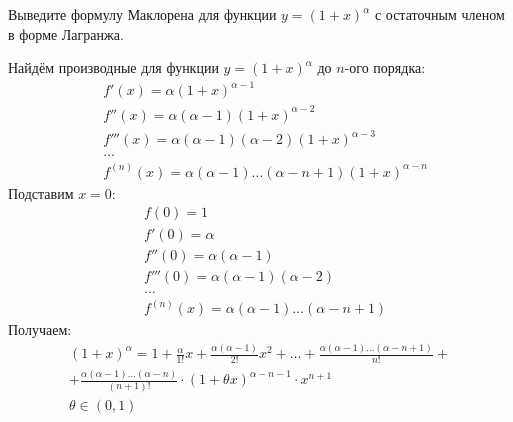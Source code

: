 \begin{question}
    Выведите формулу Маклорена для функции $y = (1 + x)^\alpha$ с остаточным членом в форме Лагранжа.
\end{question}
\begin{answer}
    Найдём производные для функции $y = (1 + x)^\alpha$ до $n$-ого порядка:
    \begin{align*}
        &f'(x) = \alpha(1 + x)^{\alpha-1} \\
        &f''(x) = \alpha(\alpha - 1)(1 + x)^{\alpha - 2} \\
        &f'''(x) = \alpha(\alpha - 1)(\alpha - 2)(1 + x)^{\alpha - 3} \\
        &\ldots \\
        &f ^{(n)}(x) = \alpha(\alpha - 1)\ldots(\alpha - n + 1)(1 + x) ^{\alpha - n}
    \end{align*}
    Подставим $x = 0$:
    \begin{align*}
        &f(0) = 1 \\
        &f'(0) = \alpha \\
        &f''(0) = \alpha(\alpha - 1) \\
        &f'''(0) = \alpha(\alpha - 1)(\alpha - 2) \\
        &\ldots \\
        &f ^{(n)}(x) = \alpha(\alpha - 1)\ldots(\alpha - n + 1)
    \end{align*}
    Получаем:
    \begin{gather*}
        (1 + x)^\alpha = 1 + \frac{\alpha}{1!} x + \frac{\alpha(\alpha - 1)}{2!} x ^2 + \ldots + \frac{\alpha(\alpha-1)\ldots(\alpha - n + 1)}{n!} + \\
        + \frac{\alpha(\alpha - 1)\ldots(\alpha - n)}{(n+1)!} \cdot (1 + \theta x) ^{\alpha - n - 1} \cdot x ^{n + 1} \\
        \theta \in (0, 1)
    \end{gather*}
\end{answer}
\pagebreak
